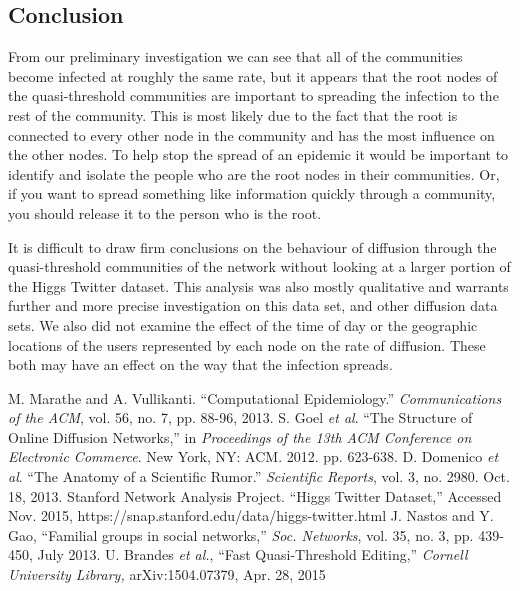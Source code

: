 \documentclass[12pt, oneside, openany]{article} %
\begin{document}
\subsection{Conclusion}
From our preliminary investigation we can see that all of the communities become infected at roughly the same rate, but it appears that the root nodes of the quasi-threshold communities are important to spreading the infection to the rest of the community. This is most likely due to the fact that the root is connected to every other node in the community and has the most influence on the other nodes. To help stop the spread of an epidemic it would be important to identify and isolate the people who are the root nodes in their communities. Or, if you want to spread something like information quickly through a community, you should release it to the person who is the root. 

It is difficult to draw firm conclusions on the behaviour of diffusion through the quasi-threshold communities of the network without looking at a larger portion of the Higgs Twitter dataset. This analysis was also mostly qualitative and warrants further and more precise investigation on this data set, and other diffusion data sets. We also did not examine the effect of the time of day or the geographic locations of the users represented by each node on the rate of diffusion. These both may have an effect on the way that the infection spreads.

\newpage
\begin{thebibliography}{1}
 M. Marathe and A. Vullikanti. ``Computational Epidemiology.'' \emph{Communications of the ACM}, vol. 56, no. 7, pp. 88-96, 2013.
 S. Goel \emph{et al}. ``The Structure of Online Diffusion Networks,'' in \emph{Proceedings of the 13th ACM Conference on Electronic Commerce}. New York, NY: ACM. 2012. pp. 623-638.
 D. Domenico \emph{et al}. ``The Anatomy of a Scientific Rumor.'' \emph{Scientific Reports}, vol. 3, no. 2980. Oct. 18, 2013.
Stanford Network Analysis Project. ``Higgs Twitter Dataset,'' Accessed Nov. 2015, https://snap.stanford.edu/data/higgs-twitter.html
J. Nastos and Y. Gao, ``Familial groups in social networks,'' \emph{Soc. Networks}, vol. 35, no. 3, pp. 439-450, July 2013.
U. Brandes \emph{et al.}, ``Fast Quasi-Threshold Editing,'' \emph{Cornell University Library,} arXiv:1504.07379, Apr. 28, 2015
 \end{thebibliography}
\end{document}
